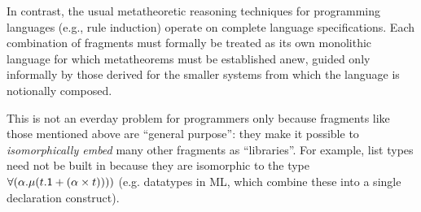 \documentclass[10pt,preprint]{sigplanconf}
\begin{document}
In contrast, the usual metatheoretic reasoning techniques for programming languages  (e.g., rule induction) operate on complete language specifications. Each {combination} of fragments must formally be treated as its own monolithic language for which  metatheorems must be established anew, guided only informally by those derived for the smaller systems from which the language is notionally composed.


This is not an everday problem for programmers only because fragments like those mentioned above are ``general purpose'': they make it possible to \emph{isomorphically embed}  many other fragments as ``libraries''. For example, list types need not be built in because they are isomorphic to the type $\forall(\alpha.\mu(t.{\sf 1} + (\alpha \times t))))$ (e.g. datatypes in ML, which combine these into a single declaration construct). %
\end{document}
